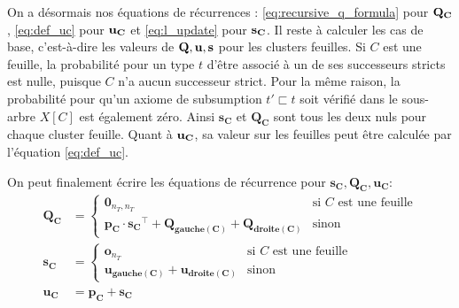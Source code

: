 On a désormais nos équations de récurrences : \ref{eq:recursive_q_formula} pour $\bf{Q_C}$, \ref{eq:def_uc} pour $\bf{u_C}$ et \ref{eq:l_update} pour $\bf{s_C}$. Il reste à calculer les cas de base, c'est-à-dire les valeurs de $\bf{Q, u, s}$ pour les clusters feuilles. Si $C$ est une feuille, la probabilité pour un type $t$ d'être associé à un de ses successeurs stricts est nulle, puisque $C$ n'a aucun successeur strict. Pour la même raison, la probabilité pour qu'un axiome de subsumption $t' \sqsubset t$ soit vérifié dans le sous-arbre $X[C]$ est également zéro. Ainsi $\mathbf{s_C}$ et $\mathbf{Q_C}$ sont tous les deux nuls pour chaque cluster feuille. Quant à $\bf{u_C}$, sa valeur sur les feuilles peut être calculée par l'équation \ref{eq:def_uc}.

On peut finalement écrire les équations de récurrence pour $\mathbf{s_C}, \mathbf{Q_C}, \mathbf{u_C}$:
\begin{align}
    \mathbf{Q_C} &=
    \begin{cases}
      \mathbf{0}_{n_T,n_T} & \text{si $C$ est une feuille}\\
      \mathbf{p_C} \cdot \mathbf{s_C}^\top + \mathbf{Q_\text{gauche$(C)$}} + \mathbf{Q_\text{droite$(C)$}} & \text{sinon}
    \end{cases}  \\
  \mathbf{s_C} &=
    \begin{cases}
      \mathbf{o}_{n_T} & \text{si $C$ est une feuille}\\
      \mathbf{u_\text{gauche$(C)$}} + \mathbf{u_\text{droite$(C)$}} & \text{sinon}
    \end{cases}  \\
    \mathbf{u_C} &= \mathbf{p_C} + \mathbf{s_C}
\end{align}

